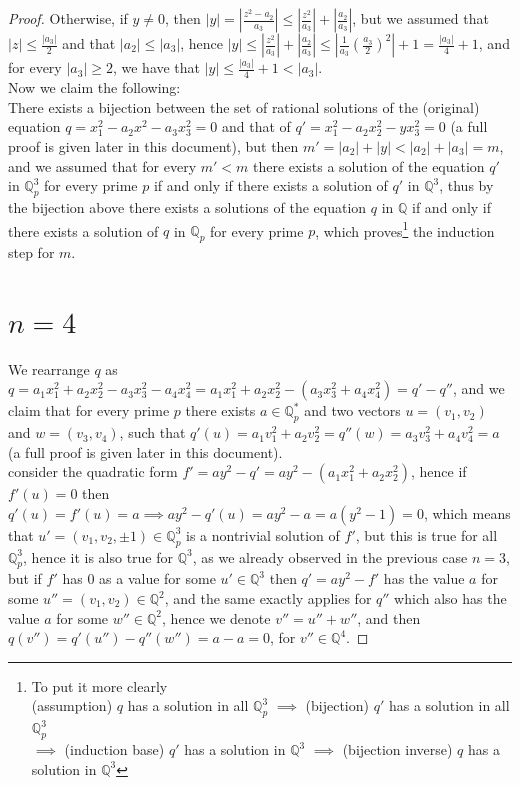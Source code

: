 \documentclass{article}
\begin{document}
\begin{proof}
Otherwise, if $y\neq0$, then $|y|=|\frac{z^2-a_2}{a_3}|\leq|\frac{z^2}{a_3}|+|\frac{a_2}{a_3}|$, but we assumed that\\ $|z|\leq\frac{|a_3|}{2}$ and that $|a_2|\leq|a_3|$, hence $|y|\leq|\frac{z^2}{a_3}|+|\frac{a_2}{a_3}|\leq|\frac{1}{a_3}(\frac{a_3}{2})^2|+1=\frac{|a_3|}{4}+1$, and for every $|a_3|\geq2$, we have that $|y|\leq\frac{|a_3|}{4}+1<|a_3|$. \\
Now we claim the following:\\
There exists a bijection between the set of rational solutions of the (original) equation $q=x_1^2-a_2x^2-a_3x_3^2=0$ and that of  $q'=x_1^2-a_2x_2^2-yx_3^2=0$ (a full proof is given later in this document), but then $m'=|a_2|+|y|<|a_2|+|a_3|=m$, and we assumed that for every $m'<m$ there exists a solution of the equation $q'$ in $\mathbb{Q}_p^3$ for every prime $p$ if and only if there exists a solution of $q'$ in $\mathbb{Q}^3$, thus by the bijection above there exists a solutions of the equation $q$ in $\mathbb{Q}$ if and only if there exists a solution of $q$ in $\mathbb{Q}_p$ for every prime $p$, which proves\footnote{To put it more clearly\\ 
(assumption) $q$ has a solution in all $\mathbb{Q}_p^3$ $\implies$ (bijection) $q'$ has a solution in all $\mathbb{Q}_p^3$\\ $\implies$ (induction base) $q'$ has a solution in $\mathbb{Q}^3$ $\implies$ (bijection inverse) $q$ has a solution in $\mathbb{Q}^3$} the induction step for $m$.

\section*{$n=4$}
We rearrange $q$ as $q=a_1x_1^2+a_2x_2^2-a_3x_3^2-a_4x_4^2=a_1x_1^2+a_2x_2^2-(a_3x_3^2+a_4x_4^2)=q'-q''$, and we claim that for every prime $p$ there exists $a\in\mathbb{Q}_p^{\ast}$ and two vectors $u=(v_1,v_2)$ and $w=(v_3,v_4)$, such that $q'(u)=a_1v_1^2+a_2v_2^2=q''(w)=a_3v_3^2+a_4v_4^2=a$ (a full proof is given later in this document).\\
consider the quadratic form $f'=ay^2-q'=ay^2-(a_1x_1^2+a_2x_2^2)$, hence if $f'(u)=0$ then $q'(u)=f'(u)=a\implies{a}y^2-q'(u)=ay^2-a=a(y^2-1)=0$, which means that $u'=(v_1,v_2,\pm1)\in\mathbb{Q}_p^3$ is a nontrivial solution of $f'$, but this is true for all $\mathbb{Q}_p^3$, hence it is also true for $\mathbb{Q}^3$, as we already observed in the previous case $n=3$, but if $f'$ has $0$ as a value for some $u'\in\mathbb{Q}^3$ then $q'=ay^2-f'$ has the value $a$ for some $u''=(v_1,v_2)\in\mathbb{Q}^2$, and the same exactly applies for $q''$ which also has the value $a$ for some $w''\in\mathbb{Q}^2$, hence we denote $v''=u''+w''$, and then $q(v'')=q'(u'')-q''(w'')=a-a=0$, for $v''\in\mathbb{Q}^4$.

\end{proof}
\end{document}
